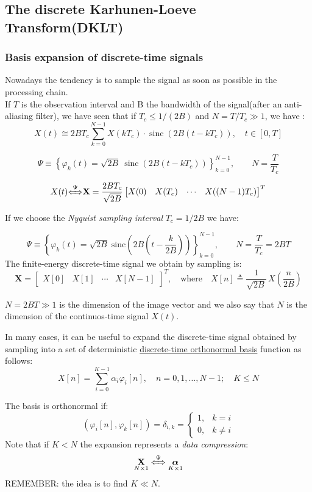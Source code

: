 \subsection{The discrete Karhunen-Loeve Transform(DKLT)}
\subsubsection{Basis expansion of discrete-time signals}
Nowadays the tendency is to sample the signal as soon as possible in the processing chain.\\
If \(T\) is the observation interval and B the bandwidth of the signal(after an anti-aliasing filter), we have seen that if \(T_c\leq1/(2B)\) and \(N=T/T_c\gg1\), we have :
\[
    X(t) \cong 2BT_{c} \sum_{k=0}^{N-1} X(kT_{c}) \cdot \operatorname{sinc}(2B(t-kT_{c})), \quad t \in [0, T]
\]

\[
    \Psi \equiv \left\{ \varphi_{k}(t) = \sqrt{2B} \ \operatorname{sinc} \left(2B(t-kT_{c})\right) \right\}_{k=0}^{N-1}, \qquad N = \frac{T}{T_{c}}
\]

\[
    X(t) {\xLeftrightarrow{\Psi}} \mathbf{X} = \frac{2BT_c}{\sqrt{2B}}
    \begin{bmatrix}
        X(0) & X(T_c) & \cdots & X((N-1)T_c)
    \end{bmatrix}^{T}
\]

\noindent If we choose the \textit{Nyquist sampling interval} \(T_c=1/2B\) we have:

\[
\Psi \equiv \left\{
    \varphi_k(t) = \sqrt{2B} \; \mathrm{sinc}\left(2B\left(t - \frac{k}{2B}\right)\right)
\right\}_{k=0}^{N-1}, \qquad
N = \frac{T}{T_c} = 2BT
\]
The finite-energy discrete-time signal we obtain by sampling is:
\[
\mathbf{X} = 
\begin{bmatrix}
    X[0] & X[1] & \cdots & X[N-1]
\end{bmatrix}^{T},
\quad \text{where} \quad 
X[n] \triangleq \frac{1}{\sqrt{2B}}\, X\left(\frac{n}{2B}\right)
\]

\noindent \(N=2BT\gg 1\) is the dimension of the image vector and we also say that \(N\) is the dimension of the continuos-time signal \(X(t)\).


\noindent In many cases, it can be useful to expand the discrete-time signal obtained by sampling into a set of deterministic \underline{discrete-time orthonormal basis} function as follows:
\[
X[n] = \sum_{i=0}^{K-1} \alpha_i \varphi_i[n], \quad n = 0, 1, \ldots, N-1; \quad K \leq N
\]

\noindent The basis is orthonormal if:\\
\[
\left( \varphi_i[n], \varphi_k[n] \right) = \delta_{i,k} = 
\begin{cases}
    1, & k = i \\
    0, & k \neq i
\end{cases}
\]
\noindent Note that if \(K<N\) the expansion represents a \textit{data compression}:
\[
\underset{N\times1}{\mathbf{X}} \xLeftrightarrow{\Psi} \underset{K\times1}{\boldsymbol{\alpha}}
\]
REMEMBER: the idea is to find \(K\ll N\).

